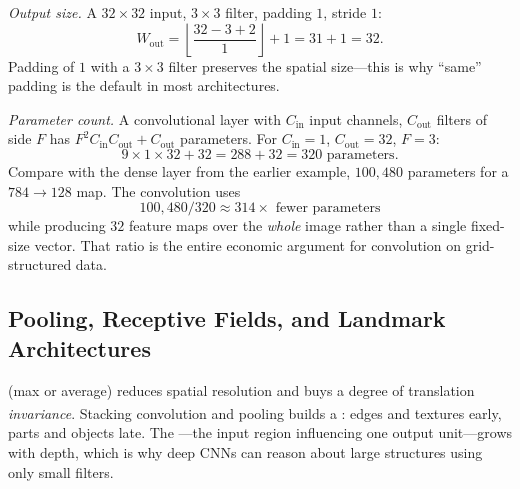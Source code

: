 \begin{workedexample}
\emph{Output size.} A $32\times32$ input, $3\times3$ filter, padding $1$,
stride $1$:
\[
  W_{\text{out}} = \left\lfloor \frac{32-3+2}{1} \right\rfloor + 1
  = 31 + 1 = 32 .
\]
Padding of $1$ with a $3\times3$ filter preserves the spatial size---this is why
``same'' padding is the default in most architectures.

\emph{Parameter count.} A convolutional layer with $C_{\text{in}}$ input
channels, $C_{\text{out}}$ filters of side $F$ has
$F^2 C_{\text{in}} C_{\text{out}} + C_{\text{out}}$ parameters. For
$C_{\text{in}}=1$, $C_{\text{out}}=32$, $F=3$:
\[
  9 \times 1 \times 32 + 32 = 288 + 32 = 320 \text{ parameters.}
\]
Compare with the dense layer from the earlier example, $100{,}480$ parameters
for a $784\to128$ map. The convolution uses
\[
  100{,}480 / 320 \approx 314\times \text{ fewer parameters}
\]
while producing $32$ feature maps over the \emph{whole} image rather than a
single fixed-size vector. That ratio is the entire economic argument for
convolution on grid-structured data.
\end{workedexample}

\subsection{Pooling, Receptive Fields, and Landmark Architectures}

 (max or average) reduces spatial resolution and buys a degree
of translation \emph{invariance}\textsuperscript{\cite[][pp.~49--50]{fleuretLittleBookDeep}}.
Stacking convolution and pooling builds a : edges and
textures early, parts and objects late. The ---the
input region influencing one output unit---grows with depth, which is why deep
CNNs can reason about large structures using only small filters.

